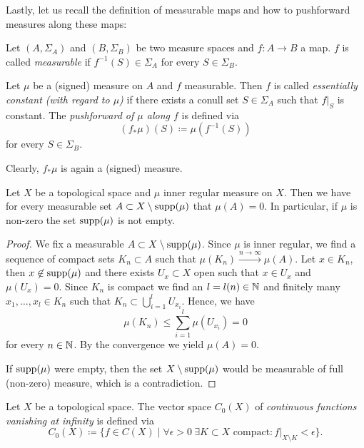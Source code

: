 Lastly, let us recall the definition of measurable maps and how to pushforward measures along these maps:

\begin{defin}
  \label{defin:pushforward}
  Let \((A, \Sigma_A)\) and \((B, \Sigma_B)\) be two measure spaces and \(f\colon A \to B\) a map. \(f\) is called \emph{measurable} if \(f^{-1}(S) \in \Sigma_A\) for every \(S \in \Sigma_B\).

  Let \(\mu\) be a (signed) measure on \(A\) and \(f\) measurable. Then \(f\) is called \emph{essentially constant (with regard to \(\mu\))} if there exists a conull set \(S \in \Sigma_A\) such that \(f|_S\) is constant. The \emph{pushforward of \(\mu\) along \(f\)} is defined via
  \[
    (f_\ast \mu)(S) \coloneqq \mu(f^{-1}(S))
  \]
  for every \(S \in \Sigma_B\).
\end{defin}

\begin{rem}
  Clearly, \(f_\ast\mu\) is again a (signed) measure.
\end{rem}

\begin{lemma}
  \label{lem:mu-supp}
  Let \(X\) be a topological space and \(\mu\) inner regular measure on \(X\). Then we have for every measurable set \(A \subset X \setminus \operatorname{supp}(\mu)\) that \(\mu(A) = 0\). In particular, if \(\mu\) is non-zero the set \(\operatorname{supp}(\mu)\) is not empty.
\end{lemma}

\begin{proof}
  We fix a measurable \(A \subset X \setminus \operatorname{supp}(\mu)\). Since \(\mu\) is inner regular, we find a sequence of compact sets \(K_n \subset A\) such that \(\mu(K_n) \xrightarrow{n \to \infty} \mu(A)\). Let \(x \in K_n\), then \(x \not \in \operatorname{supp}(\mu)\) and there exists \(U_x \subset X\) open such that \(x \in U_x\) and \(\mu(U_x) = 0\). Since \(K_n\) is compact we find an \(l = l(n) \in \mathbb{N}\) and finitely many \(x_1, \dots, x_l \in K_n\) such that \(K_n \subset \bigcup_{i=1}^l U_{x_i}\). Hence, we have
  \[
    \mu(K_n) \leq \sum_{i=1}^l \mu(U_{x_i}) = 0
  \]
  for every \(n \in \mathbb{N}\). By the convergence we yield \(\mu(A) = 0\).

  If \(\operatorname{supp}(\mu)\) were empty, then the set \(X \setminus \operatorname{supp}(\mu)\) would be measurable of full (non-zero) measure, which is a contradiction.
\end{proof}

\begin{defin}
  \label{def:vanishing}
  Let \(X\) be a topological space. The vector space \(C_0(X)\) of \emph{continuous functions vanishing at infinity} is defined via
  \[
    C_0(X) \coloneqq \{f \in C(X) \mid \forall \epsilon > 0\ \exists K \subset X \text{ compact}\colon f|_{X\setminus K} < \epsilon\}.
  \]
\end{defin}

